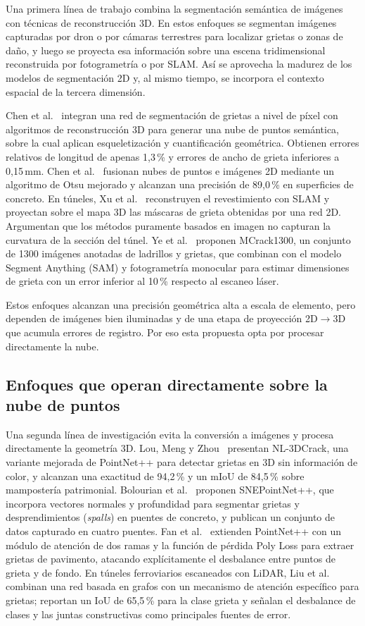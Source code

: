 \documentclass[5p]{elsarticle}
\begin{document}
Una primera línea de trabajo combina la segmentación semántica de imágenes con técnicas de reconstrucción 3D. En estos enfoques se segmentan imágenes capturadas por dron o por cámaras terrestres para localizar grietas o zonas de daño, y luego se proyecta esa información sobre una escena tridimensional reconstruida por fotogrametría o por SLAM. Así se aprovecha la madurez de los modelos de segmentación 2D y, al mismo tiempo, se incorpora el contexto espacial de la tercera dimensión.

Chen et al.~\cite{Chen2025} integran una red de segmentación de grietas a nivel de píxel con algoritmos de reconstrucción 3D para generar una nube de puntos semántica, sobre la cual aplican esqueletización y cuantificación geométrica. Obtienen errores relativos de longitud de apenas 1,3\,\% y errores de ancho de grieta inferiores a 0,15\,mm. Chen et al.~\cite{Chen2021} fusionan nubes de puntos e imágenes 2D mediante un algoritmo de Otsu mejorado y alcanzan una precisión de 89,0\,\% en superficies de concreto. En túneles, Xu et al.~\cite{Xu2025} reconstruyen el revestimiento con SLAM y proyectan sobre el mapa 3D las máscaras de grieta obtenidas por una red 2D. Argumentan que los métodos puramente basados en imagen no capturan la curvatura de la sección del túnel. Ye et al.~\cite{Ye2024} proponen MCrack1300, un conjunto de 1300 imágenes anotadas de ladrillos y grietas, que combinan con el modelo Segment Anything (SAM) y fotogrametría monocular para estimar dimensiones de grieta con un error inferior al 10\,\% respecto al escaneo láser.

Estos enfoques alcanzan una precisión geométrica alta a escala de elemento, pero dependen de imágenes bien iluminadas y de una etapa de proyección 2D$\rightarrow$3D que acumula errores de registro. Por eso esta propuesta opta por procesar directamente la nube.

\subsection{Enfoques que operan directamente sobre la nube de puntos}

Una segunda línea de investigación evita la conversión a imágenes y procesa directamente la geometría 3D. Lou, Meng y Zhou~\cite{Lou2025} presentan NL-3DCrack, una variante mejorada de PointNet++ para detectar grietas en 3D sin información de color, y alcanzan una exactitud de 94,2\,\% y un mIoU de 84,5\,\% sobre mampostería patrimonial. Bolourian et al.~\cite{Bolourian2023} proponen SNEPointNet++, que incorpora vectores normales y profundidad para segmentar grietas y desprendimientos (\emph{spalls}) en puentes de concreto, y publican un conjunto de datos capturado en cuatro puentes. Fan et al.~\cite{Fan2024} extienden PointNet++ con un módulo de atención de dos ramas y la función de pérdida Poly Loss para extraer grietas de pavimento, atacando explícitamente el desbalance entre puntos de grieta y de fondo. En túneles ferroviarios escaneados con LiDAR, Liu et al.~\cite{Liu2025} combinan una red basada en grafos con un mecanismo de atención específico para grietas; reportan un IoU de 65,5\,\% para la clase grieta y señalan el desbalance de clases y las juntas constructivas como principales fuentes de error.
\end{document}
